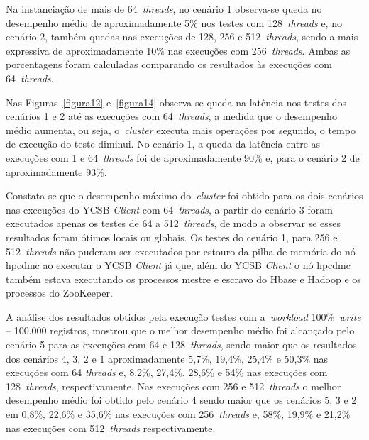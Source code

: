 \documentclass[12pt]{article}
\begin{document}
Na instanciação de mais de 64~\emph{threads}, no cenário 1 observa-se queda no desempenho médio de aproximadamente 5\% nos testes com 128~\emph{threads} e, no cenário 2, também quedas nas execuções de 128, 256 e 512~\emph{threads}, sendo a mais expressiva de aproximadamente 10\% nas execuções com 256~\emph{threads}. 
Ambas as porcentagens foram calculadas comparando os resultados às execuções com 64~\emph{threads}.

Nas Figuras~\ref{figura12} e~\ref{figura14} observa-se queda na latência nos testes dos cenários 1 e 2 até as execuções com 64~\emph{threads}, a medida que o desempenho médio aumenta, ou seja, o~\emph{cluster} executa mais operações por segundo, o tempo de execução do teste diminui. No cenário 1, a queda da latência entre as execuções com 1 e 64~\emph{threads} foi de aproximadamente 90\% e, para o cenário 2 de aproximadamente 93\%.

Constata-se que o desempenho máximo do~\emph{cluster} foi obtido para os dois cenários nas execuções do YCSB \textit{Client} com 64~\emph{threads}, a partir do cenário 3 foram executados apenas os testes de 64 a 512~\emph{threads}, de modo a observar se esses resultados foram ótimos locais ou globais. Os testes do cenário 1, para 256 e 512~\emph{threads} não puderam ser executados por estouro da pilha de memória do nó hpcdmc ao executar o YCSB \textit{Client} já que, além do YCSB \textit{Client} o nó hpcdmc também estava executando os processos mestre e escravo do Hbase e Hadoop e os processos do ZooKeeper.

A análise dos resultados obtidos pela execução testes com a~\emph{workload} 100\%~\emph{write} -- 100.000 registros, mostrou que o melhor desempenho médio foi alcançado pelo cenário 5 para as execuções com 64 e 128~\emph{threads}, sendo maior que os resultados dos cenários 4, 3, 2 e 1 aproximadamente 5,7\%, 19,4\%, 25,4\% e 50,3\% nas execuções com 64 \emph{threads} e, 8,2\%, 27,4\%, 28,6\% e 54\% nas execuções com 128~\emph{threads}, respectivamente. 
Nas execuções com 256 e 512~\emph{threads} o melhor desempenho médio foi obtido pelo cenário 4 sendo maior que os cenários 5, 3 e 2 em 0,8\%, 22,6\% e 35,6\% nas execuções com 256~\emph{threads} e, 58\%, 19,9\% e 21,2\% nas execuções com 512~\emph{threads} respectivamente.
\end{document}
